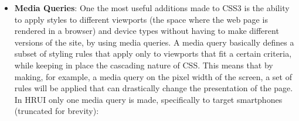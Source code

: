 \begin{itemize}
  \item \textbf{Media Queries}: One the most useful additions made to CSS3 is the ability to apply styles to different
  viewports (the space where the web page is rendered in a browser) and device types without having to make different versions
  of the site, by using media queries. A media query basically defines a subset of styling rules that apply only to viewports
  that fit a certain criteria, while keeping in place the cascading nature of CSS. This means that by making, for example, a
  media query on the pixel width of the screen, a set of rules will be applied that can drastically change the presentation of
  the page. In HRUI only one media query is made, specifically to target smartphones (truncated for brevity):\\


\end{itemize}
